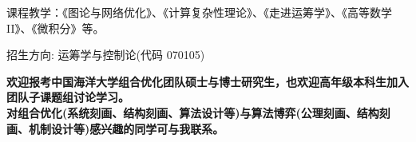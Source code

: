 %
%


{
课程教学：《图论与网络优化》、《计算复杂性理论》、《走进运筹学》、《高等数学II》、《微积分》等。

招生方向: 运筹学与控制论(代码 070105)

\textcolor{BrickRed}{\textbf{欢迎报考中国海洋大学组合优化团队硕士与博士研究生，也欢迎高年级本科生加入团队子课题组讨论学习。\\
对组合优化(系统刻画、结构刻画、算法设计等)与算法博弈(公理刻画、结构刻画、机制设计等)感兴趣的同学可与我联系。}}

}